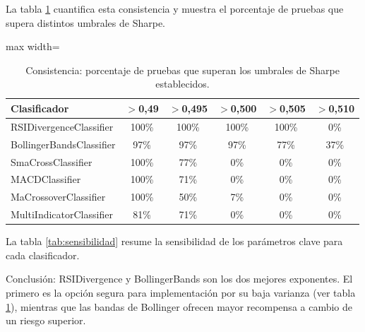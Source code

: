 La tabla \ref{tab:consistencia} cuantifica esta consistencia y muestra el porcentaje de pruebas que supera distintos umbrales de Sharpe.

\begin{table}[H]
    \centering
    \caption[Consistencia Sharpe]{Consistencia: porcentaje de pruebas que superan los umbrales de Sharpe establecidos.}
    \small
    \begin{adjustbox}{max width=\textwidth}
    \begin{tabular}{l c c c c c}
        \toprule
        \textbf{Clasificador} & \textbf{$>$0,49} & \textbf{$>$0,495} & \textbf{$>$0,500} & \textbf{$>$0,505} & \textbf{$>$0,510} \\
        \midrule
        RSIDivergenceClassifier  & 100\% & 100\% & 100\% & 100\% & 0\% \\
        BollingerBandsClassifier & 97\%  & 97\%  & 97\%  & 77\%  & 37\% \\
        SmaCrossClassifier       & 100\% & 77\%  & 0\%   & 0\%   & 0\% \\
        MACDClassifier           & 100\% & 71\%  & 0\%   & 0\%   & 0\% \\
        MaCrossoverClassifier    & 100\% & 50\%  & 7\%   & 0\%   & 0\% \\
        MultiIndicatorClassifier & 81\%  & 71\%  & 0\%   & 0\%   & 0\% \\
        \bottomrule
    \end{tabular}
    \end{adjustbox}
    \label{tab:consistencia}
\end{table}

La tabla \ref{tab:sensibilidad} resume la sensibilidad de los parámetros clave para cada clasificador.


Conclusión: RSIDivergence y BollingerBands son los dos mejores exponentes. El primero es la opción segura para implementación por su baja varianza (ver tabla \ref{tab:consistencia}), mientras que las bandas de Bollinger ofrecen mayor recompensa a cambio de un riesgo superior.

